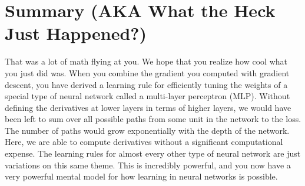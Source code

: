 \documentclass[assignment06_Solutions]{subfiles}
\begin{document}
\section{Summary (AKA What the Heck Just Happened?)}
That was a lot of math flying at you.  We hope that you realize how cool what you just did was.  When you combine the gradient you computed with gradient descent, you have derived a learning rule for efficiently tuning the weights of a special type of neural network called a multi-layer perceptron (MLP).  Without defining the derivatives at lower layers in terms of higher layers, we would have been left to sum over all possible paths from some unit in the network to the loss.  The number of paths would grow exponentially with the depth of the network.  Here, we are able to compute derivatives without a significant computational expense.  The learning rules for almost every other type of neural network are just variations on this same theme.  This is incredibly powerful, and you now have a very powerful mental model for how learning in neural networks is possible.
%
%
%
%
%
%
%
%
%
\end{document}
